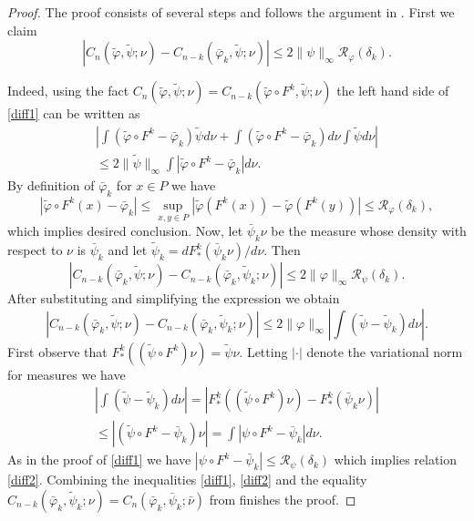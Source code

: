 \documentclass[a4paper,12pt]{amsart}
\numberwithin{equation}{section}
\begin{document}
\begin{proof}
The proof consists of several steps and follows the argument in
\cite{AlvPin}. First we claim \begin{equation}\label{diff1} |C_n(\tilde\varphi,
\tilde\psi; \nu)- C_{n-k}(\bar\varphi_k, \tilde\psi; \nu)|\le 2
\|\psi\|_\infty\mathcal R_\varphi(\delta_k). \end{equation}

Indeed, using the fact $C_n(\tilde\varphi, \tilde\psi;
\nu)=C_{n-k}(\tilde\varphi\circ F^k, \tilde\psi; \nu)$ the left hand
side of \ref{diff1} can be written as
\begin{align*}\left|\int(\tilde\varphi\circ
F^k-\bar\varphi_k)\tilde\psi d\nu+\int(\tilde\varphi\circ
F^k-\bar\varphi_k)d\nu\int\tilde\psi d\nu\right|\\ \le
2\|\tilde\psi\|_\infty\int|\tilde\varphi\circ
F^k-\bar\varphi_k|d\nu.
\end{align*}
By definition of $\bar\varphi_k$ for $x\in P$ we have
$$|\tilde\varphi\circ F^k(x)-\bar\varphi_k|\le
\sup_{x, y\in P}|\tilde\varphi(F^k(x))-\tilde\varphi(F^k(y))|\le
\mathcal R_\varphi(\delta_k),$$ which implies desired conclusion.
Now, let $\bar\psi_k\nu$ be the measure whose density with respect
to $\nu$ is $\bar\psi_k$ and let $\tilde\psi_k=
dF_\ast^k(\bar\psi_k\nu)/d\nu.$ Then \begin{equation}\label{diff2}
|C_{n-k}(\bar\varphi_k, \tilde\psi; \nu)- C_{n-k}(\bar\varphi_k,
\tilde\psi_k; \nu)|\le 2 \|\varphi\|_\infty\mathcal
R_\psi(\delta_k). \end{equation} After substituting and simplifying the
expression we obtain
$$|C_{n-k}(\bar\varphi_k, \tilde\psi; \nu)- C_{n-k}(\bar\varphi_k,
\tilde\psi_k; \nu)|\le
2\|\varphi\|_\infty\left|\int(\tilde\psi-\tilde\psi_k)d\nu\right|.$$
First observe that $F^k_\ast((\tilde\psi\circ
F^k)\nu)=\tilde\psi\nu.$ Letting $|\cdot|$ denote the variational
norm for measures we have
\begin{align*}
\left|\int(\tilde\psi-\tilde\psi_k)d\nu\right|
=|F^k_\ast((\tilde\psi\circ F^k)\nu)-F^k_\ast(\bar\psi_k\nu)|
\\
\le |(\tilde\psi\circ F^k-\bar\psi_k)\nu|=\int|\psi\circ
F^k-\bar\psi_k|d\nu.
\end{align*}
As in the proof of \eqref{diff1} we have  $|\psi\circ
F^k-\bar\psi_k|\le\mathcal R_\psi(\delta_k)$ which implies relation
\ref{diff2}. Combining the inequalities \eqref{diff1}, \eqref{diff2}
and  the equality $C_{n-k}(\bar\varphi_k, \tilde\psi_k;
\nu)=C_n(\bar\varphi_k, \bar\psi_k; \bar\nu)$ from \cite{AlvPin}
finishes the proof.
\end{proof}
\end{document}
